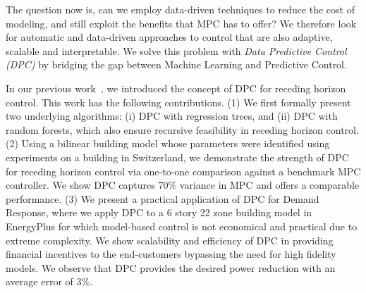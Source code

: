 	
The question now is, can we employ data-driven techniques to reduce the cost of modeling, and still exploit the benefits that MPC has to offer? We therefore look for automatic and data-driven approaches to control that are also adaptive, scalable and interpretable. We solve this problem with \textit{Data Predictive Control (DPC)} by bridging the gap between Machine Learning and Predictive Control.

In our previous work~\cite{Behl2016,Jain2016,JainACC2017,JainCDC2017}, we introduced the concept of DPC for receding horizon control.
This work has the following contributions.
(1) We first formally present two underlying algorithms: (i) DPC with regression trees, and (ii) DPC with random forests, which also ensure recursive feasibility in receding horizon control.
(2) Using a bilinear building model whose parameters were identified using experiments on a building in Switzerland, we demonstrate the strength of DPC for receding horizon control via one-to-one comparison against a benchmark MPC controller. We show DPC captures 70\% variance in MPC and offers a comparable performance.
(3) We present a practical application of DPC for Demand Response, where we apply DPC to a 6 story 22 zone building model in EnergyPlus \cite{Crawley2001} for which model-based control is not economical and practical due to extreme complexity. We show scalability and efficiency of DPC in providing financial incentives to the end-customers bypassing the need for high fidelity models. We observe that DPC provides the desired power reduction with an average error of 3\%.



